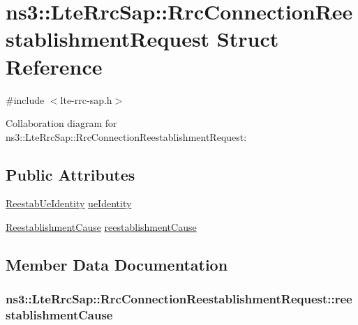 \hypertarget{structns3_1_1LteRrcSap_1_1RrcConnectionReestablishmentRequest}{}\section{ns3\+:\+:Lte\+Rrc\+Sap\+:\+:Rrc\+Connection\+Reestablishment\+Request Struct Reference}
\label{structns3_1_1LteRrcSap_1_1RrcConnectionReestablishmentRequest}


{\ttfamily \#include $<$lte-\/rrc-\/sap.\+h$>$}



Collaboration diagram for ns3\+:\+:Lte\+Rrc\+Sap\+:\+:Rrc\+Connection\+Reestablishment\+Request\+:
\subsection*{Public Attributes}
\begin{DoxyCompactItemize}
\item 
\hyperlink{structns3_1_1LteRrcSap_1_1ReestabUeIdentity}{Reestab\+Ue\+Identity} \hyperlink{structns3_1_1LteRrcSap_1_1RrcConnectionReestablishmentRequest_af4b77e49ed18202b2a340a1312088f5d}{ue\+Identity}
\item 
\hyperlink{classns3_1_1LteRrcSap_ae749c5fa44cab5b732095b42f4845659}{Reestablishment\+Cause} \hyperlink{structns3_1_1LteRrcSap_1_1RrcConnectionReestablishmentRequest_a58dcbc5ec3a15e3007d8584992251386}{reestablishment\+Cause}
\end{DoxyCompactItemize}


\subsection{Member Data Documentation}
\subsubsection[{\texorpdfstring{reestablishment\+Cause}{reestablishmentCause}}]{ ns3\+::\+Lte\+Rrc\+Sap\+::\+Rrc\+Connection\+Reestablishment\+Request\+::reestablishment\+Cause}\hypertarget{structns3_1_1LteRrcSap_1_1RrcConnectionReestablishmentRequest_a58dcbc5ec3a15e3007d8584992251386}{}\label{structns3_1_1LteRrcSap_1_1RrcConnectionReestablishmentRequest_a58dcbc5ec3a15e3007d8584992251386}
